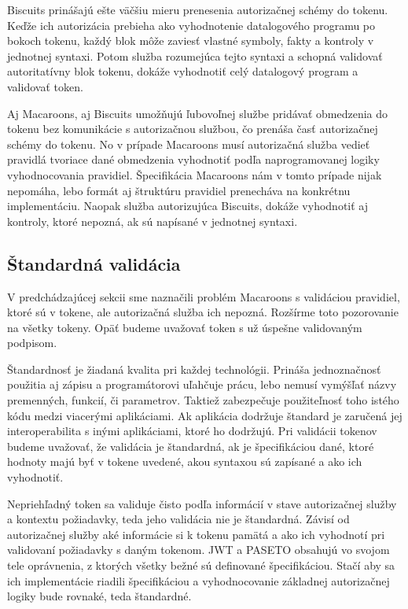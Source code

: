 Biscuits prinášajú ešte väčšiu mieru prenesenia autorizačnej schémy do tokenu. Keďže ich autorizácia prebieha ako vyhodnotenie datalogového programu po bokoch tokenu, každý blok môže zaviesť vlastné symboly, fakty a kontroly v jednotnej syntaxi. Potom služba rozumejúca tejto syntaxi a schopná validovať autoritatívny blok tokenu, dokáže vyhodnotiť celý datalogový program a validovať token.

Aj Macaroons, aj Biscuits umožňujú ľubovoľnej službe pridávať obmedzenia do tokenu bez komunikácie s autorizačnou službou, čo prenáša časť autorizačnej schémy do tokenu. No v prípade Macaroons musí autorizačná služba vedieť pravidlá tvoriace dané obmedzenia vyhodnotiť podľa naprogramovanej logiky vyhodnocovania pravidiel. Špecifikácia Macaroons \cite{macaroons_paper} nám v tomto prípade nijak nepomáha, lebo formát aj štruktúru pravidiel prenecháva na konkrétnu implementáciu. Naopak služba autorizujúca Biscuits, dokáže vyhodnotiť aj kontroly, ktoré nepozná, ak sú napísané v jednotnej syntaxi.

\subsection{Štandardná validácia}

V predchádzajúcej sekcii sme naznačili problém Macaroons s validáciou pravidiel, ktoré sú v tokene, ale autorizačná služba ich nepozná. Rozšírme toto pozorovanie na všetky tokeny. Opäť budeme uvažovať token s už úspešne validovaným podpisom.

Štandardnosť je žiadaná kvalita pri každej technológii. Prináša jednoznačnosť použitia aj zápisu a programátorovi uľahčuje prácu, lebo nemusí vymýšľať názvy premenných, funkcií, či parametrov. Taktiež zabezpečuje použiteľnosť toho istého kódu medzi viacerými aplikáciami. Ak aplikácia dodržuje štandard je zaručená jej interoperabilita s inými aplikáciami, ktoré ho dodržujú. Pri validácii tokenov budeme uvažovať, že validácia je štandardná, ak je špecifikáciou dané, ktoré hodnoty majú byť v tokene uvedené, akou syntaxou sú zapísané a ako ich vyhodnotiť.

Nepriehľadný token sa validuje čisto podľa informácií v stave autorizačnej služby a kontextu požiadavky, teda jeho validácia nie je štandardná. Závisí od autorizačnej služby aké informácie si k tokenu pamätá a ako ich vyhodnotí pri validovaní požiadavky s daným tokenom. JWT a PASETO obsahujú vo svojom tele oprávnenia, z ktorých všetky bežné sú definované špecifikáciou. Stačí aby sa ich implementácie riadili špecifikáciou a vyhodnocovanie základnej autorizačnej logiky bude rovnaké, teda štandardné.


